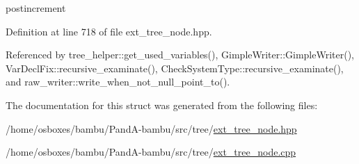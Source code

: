 postincrement 



Definition at line 718 of file ext\+\_\+tree\+\_\+node.\+hpp.



Referenced by tree\+\_\+helper\+::get\+\_\+used\+\_\+variables(), Gimple\+Writer\+::\+Gimple\+Writer(), Var\+Decl\+Fix\+::recursive\+\_\+examinate(), Check\+System\+Type\+::recursive\+\_\+examinate(), and raw\+\_\+writer\+::write\+\_\+when\+\_\+not\+\_\+null\+\_\+point\+\_\+to().



The documentation for this struct was generated from the following files\+:\begin{DoxyCompactItemize}
\item 
/home/osboxes/bambu/\+Pand\+A-\/bambu/src/tree/\hyperlink{ext__tree__node_8hpp}{ext\+\_\+tree\+\_\+node.\+hpp}\item 
/home/osboxes/bambu/\+Pand\+A-\/bambu/src/tree/\hyperlink{ext__tree__node_8cpp}{ext\+\_\+tree\+\_\+node.\+cpp}\end{DoxyCompactItemize}
